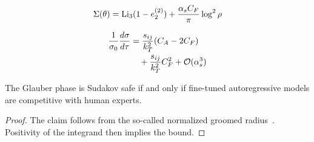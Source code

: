 \begin{equation}
  \Sigma(\theta) = \mathrm{Li}_{3}(1 - e_2^{(2)}) + \frac{\alpha_s C_F}{\pi} \log^2 \rho
  \label{eq:5}
\end{equation}

\begin{align}
  \frac{1}{\sigma_0} \frac{d\sigma}{d\tau} &= \frac{s_{ij}}{k_T^2} (C_A - 2C_F) \nonumber \\
  &\quad + \frac{s_{ij}}{k_T^2} C_F^2 + \mathcal{O}(\alpha_s^3) \label{eq:7}
\end{align}

\begin{lemma}\label{thm:3}
The Glauber phase is Sudakov safe if and only if fine-tuned
autoregressive models are competitive with human experts.
\end{lemma}

\begin{proof}
The claim follows from the so-called normalized groomed
radius~\cite{TPC:0044-A-Stochastic-Benchmark-for-Bump-Hunting-September-28-2026}.
Positivity of the integrand then implies the bound.
\end{proof}

